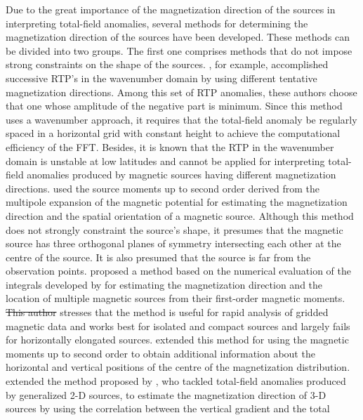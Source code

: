 \documentclass[journal abbreviation, npg]{copernicus}
\providecommand{\DIFadd}[1]{{\protect\color{blue}\uwave{#1}}} %
\providecommand{\DIFdel}[1]{{\protect\color{red}\sout{#1}}}                      %
\providecommand{\DIFaddbegin}{} %
\providecommand{\DIFaddend}{} %
\providecommand{\DIFdelbegin}{} %
\providecommand{\DIFdelend}{} %
\begin{document}
Due to the great importance of the magnetization direction of the 
sources in interpreting total-field anomalies, several methods for 
determining the magnetization direction of
the sources have been developed. These methods can be divided into two
groups. The first one comprises methods that do not impose strong constraints
on the shape of the sources. \citet{fedi-etal1994}, for example, accomplished
successive RTP's in the wavenumber domain by using different tentative
magnetization directions. Among this set of RTP anomalies, these authors
choose that one whose amplitude of the negative part is minimum. Since this
method uses a wavenumber approach, it requires that the total-field anomaly
be regularly spaced in a horizontal grid with constant height to achieve the
computational efficiency of the FFT. Besides, it is known that the RTP in the
wavenumber domain is unstable at low latitudes and cannot be applied for
interpreting total-field anomalies produced by magnetic sources having
different magnetization directions. \citet{medeiros-silva1995} used the
source moments up to second order derived from the multipole expansion of the
magnetic potential for estimating the magnetization direction and the spatial
orientation of a magnetic source. Although this method does not strongly
constraint the source's shape, it presumes that the magnetic source has three
orthogonal planes of symmetry intersecting each other at the centre of the
source. It is also presumed that the source is far from the observation
points. \citet{phillips2005} proposed a method based on the numerical
evaluation of the integrals developed by \citet{helbig1963} for estimating
the magnetization direction and the location of multiple magnetic sources
from their first-order magnetic moments. \DIFdelbegin \DIFdel{This author }\DIFdelend \DIFaddbegin \DIFadd{\mbox{%
\citet{phillips2005}
}%
}\DIFaddend stresses 
that the method
is useful for rapid analysis of gridded magnetic data and works best for
isolated and compact sources and largely fails for horizontally elongated
sources. \citet{tontini-pedersen2008} extended this method for using the
magnetic moments up to second order to obtain additional information about
the horizontal and vertical positions of the centre of the magnetization
distribution. \citet{dannemiller-li2006} extended the method proposed by
\citet{roest-pilkington1993}, who tackled total-field anomalies produced by
generalized 2-D sources, to estimate the magnetization direction of 3-D
sources by using the correlation between the vertical gradient and the total
\end{document}
